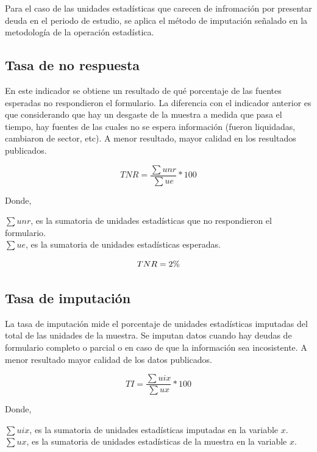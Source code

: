 \documentclass[
]{article}
\begin{document}
Para el caso de las unidades estadísticas que carecen de infromación por
presentar deuda en el periodo de estudio, se aplica el método de
imputación señalado en la metodología de la operación estadística.

\hypertarget{tasa-de-no-respuesta}{%
\subsection{Tasa de no respuesta}\label{tasa-de-no-respuesta}}

En este indicador se obtiene un resultado de qué porcentaje de las
fuentes esperadas no respondieron el formulario. La diferencia con el
indicador anterior es que considerando que hay un desgaste de la muestra
a medida que pasa el tiempo, hay fuentes de las cuales no se espera
información (fueron liquidadas, cambiaron de sector, etc). A menor
resultado, mayor calidad en los resultados publicados.

\begin{equation*}
TNR = \frac{\sum unr}{\sum ue}*100
\end{equation*}

Donde,

\(\sum unr\), es la sumatoria de unidades estadísticas que no
respondieron el formulario.\\
\(\sum ue\), es la sumatoria de unidades estadísticas esperadas.

\begin{equation*}
TNR = 2\%\\
\end{equation*}

\hypertarget{tasa-de-imputaciuxf3n}{%
\subsection{Tasa de imputación}\label{tasa-de-imputaciuxf3n}}

La tasa de imputación mide el porcentaje de unidades estadísticas
imputadas del total de las unidades de la muestra. Se imputan datos
cuando hay deudas de formulario completo o parcial o en caso de que la
información sea incosistente. A menor resultado mayor calidad de los
datos publicados.

\begin{equation*}
TI = \frac{\sum uix}{\sum ux}*100
\end{equation*}

Donde,

\(\sum uix\), es la sumatoria de unidades estadísticas imputadas en la
variable \(x\).\\
\(\sum ux\), es la sumatoria de unidades estadísticas de la muestra en
la variable \(x\).
\end{document}
